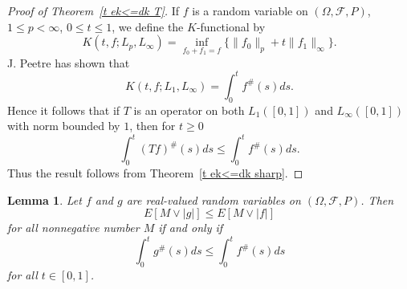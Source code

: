 \documentclass[12pt]{amsart}
\newtheorem{lem}{Lemma}
\begin{document}
\begin{proof}[Proof of Theorem~\ref{t ek<=dk T}]
If $f$ is a random variable on $(\Omega ,\mathcal{F},P)$, $1\leq
p<\infty$, $0\leq t\leq 1$, we define the $K$-functional by
\[K(t,f;L_p,L_\infty)=\inf_{f_0+f_1=f}\{\|f_0\|_p+t\|f_1\|_\infty \}.\]
J. Peetre \cite{P} has shown that
\[K(t,f;L_1,L_\infty) = \int_0^t f^{\#} (s)ds .\]
Hence it follows that if $T$ is an operator on both $L_1([0,1])$ 
and $L_\infty([0,1])$ with norm bounded by $1$, then for $t \ge 0$
\[ \int_0^t (Tf)^{\#}(s) ds \le \int_0^t f^{\#}(s) ds . \]
Thus the result follows from
Theorem~\ref{t ek<=dk sharp}.
\end{proof}

\begin{lem}
\label{l Mg<=Mf}
Let $f$ and $g$ are real-valued random variables on
$(\Omega ,\mathcal{F},P)$.  Then 
\begin{equation}
\label{Mg<=Mf}
E \left[ M \vee |g| \right]\leq E\left[M \vee |f| \right]
\end{equation}
for all nonnegative number $M$  if and
only if 
\[\int_0^t g^{\#}(s) ds\leq \int_0^t f^{\#}(s) ds \]
for all $t\in [0,1]$.
\end{lem}
\end{document}
